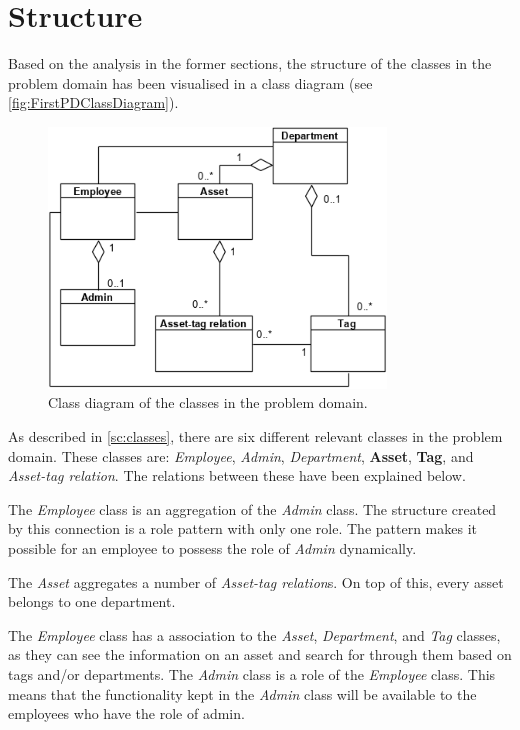 \section{Structure}\label{sc:structure}
Based on the analysis in the former sections, the structure of the classes in the problem domain has been visualised in a class diagram (see \autoref{fig:FirstPDClassDiagram}).

\begin{figure}[H]
    \centering
    \includegraphics[width=0.8\textwidth]{figures/ClassDiagrams/Class_activity_class_diagram.png}
    \caption{Class diagram of the classes in the problem domain.}
    \label{fig:FirstPDClassDiagram}
\end{figure}

As described in \autoref{sc:classes}, there are six different relevant classes in the problem domain. These classes are: \textit{Employee}, \textit{Admin}, \textit{Department}, \textbf{Asset}, \textbf{Tag}, and \textit{Asset-tag relation}. The relations between these have been explained below.
\par

The \textit{Employee} class is an aggregation of the \textit{Admin} class. The structure created by this connection is a role pattern with only one role. The pattern makes it possible for an employee to possess the role of \textit{Admin} dynamically.
\par

The \textit{Asset} aggregates a number of \textit{Asset-tag relation}s. On top of this, every asset belongs to one department.
\par

The \textit{Employee} class has a association to the \textit{Asset}, \textit{Department}, and \textit{Tag} classes, as they can see the information on an asset and search for through them based on tags and/or departments. The \textit{Admin} class is a role of the \textit{Employee} class. This means that the functionality kept in the \textit{Admin} class will be available to the employees who have the role of admin.
\par


